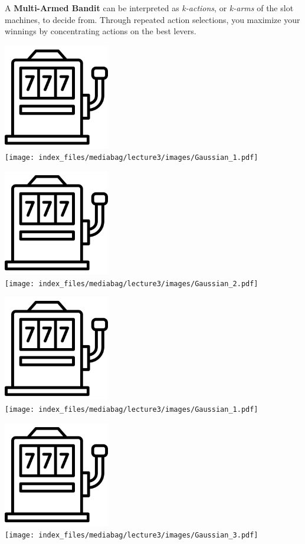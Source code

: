 \documentclass[
  letterpaper,
  DIV=11,
  numbers=noendperiod]{scrreprt}
\begin{document}
A \textbf{Multi-Armed Bandit} can be interpreted as \emph{k-actions}, or
\emph{k-arms} of the slot machines, to decide from. Through repeated
action selections, you maximize your winnings by concentrating actions
on the best levers.

\includegraphics[width=1.82292in,height=1.82292in]{lecture3/images/Bandit.png}\\
\texttt{[image: index\_files/mediabag/lecture3/images/Gaussian\_1.pdf]}

\includegraphics[width=1.82292in,height=1.82292in]{lecture3/images/Bandit.png}\\
\texttt{[image: index\_files/mediabag/lecture3/images/Gaussian\_2.pdf]}

\includegraphics[width=1.82292in,height=1.82292in]{lecture3/images/Bandit.png}\\
\texttt{[image: index\_files/mediabag/lecture3/images/Gaussian\_1.pdf]}

\includegraphics[width=1.82292in,height=1.82292in]{lecture3/images/Bandit.png}\\
\texttt{[image: index\_files/mediabag/lecture3/images/Gaussian\_3.pdf]}
\end{document}
